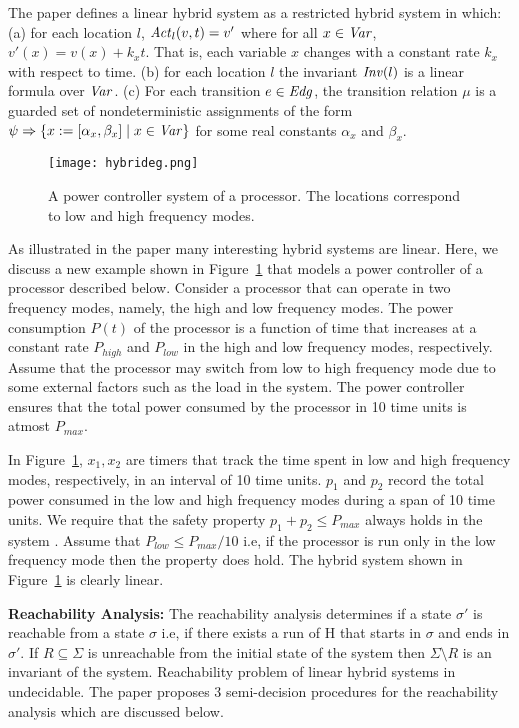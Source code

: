 The paper defines a linear hybrid system as a restricted hybrid system in which:
(a) for each location $l$, $\mathit{Act}_l(v,t) = v'$ where for all $x \in \mathit{Var}$, $v'(x) = v(x) + k_x t$. That is, each variable $x$ changes with a constant rate $k_x$ with respect to time.
(b) for each location $l$ the invariant $\mathit{Inv}(l)$ is a linear formula over $\mathit{Var}$.
(c) For each transition $e \in \mathit{Edg}$, the transition relation $\mu$ is a guarded set of nondeterministic assignments of the form $\psi \Rightarrow \{ x := [\alpha_x,\beta_x] \; | \; x \in \mathit{Var} \}$ for some real constants $\alpha_x$ and $\beta_x$.

\begin{figure}
\texttt{[image: hybrideg.png]} 
\caption{A power controller system of a processor.  
The locations correspond to low and high frequency modes.} \label{fig:hsys}
\end{figure}

As illustrated in the paper many interesting hybrid systems are linear.
Here, we discuss a new example shown in  Figure~\ref{fig:hsys} that models a power controller 
of a processor described below.
Consider a processor that can operate in two frequency modes, namely, the high and low frequency modes.
The power consumption $P(t)$ of the processor is a function of time that increases at a constant rate $P_{high}$ and
$P_{low}$ in the high and low frequency modes, respectively. 
Assume that the processor may switch from low to high frequency mode due to some external factors such as the load in the 
system. The power controller ensures that the total power consumed by the processor in 10 time units is atmost $P_{max}$. 

In Figure~\ref{fig:hsys}, $x_1, x_2$ are timers that track the time spent in low and high frequency modes, respectively, in an interval of 10 time units.
$p_1$ and $p_2$ record the total power consumed in the low and high frequency modes during a span of 10 time units.
We require that the safety property $p_1 + p_2 \le P_{max}$ always holds in the system .
Assume that $P_{low} \le P_{max}/10$ i.e, if the processor is run only in the low frequency mode then the property does hold.
The hybrid system shown in Figure~\ref{fig:hsys} is clearly linear.

\textbf{Reachability Analysis:}
The reachability analysis determines if a state $\sigma'$ is reachable from a state $\sigma$ i.e, if there exists
a run of H that starts in $\sigma$ and ends in $\sigma'$. If $R \subseteq \Sigma$ is unreachable from the initial state of the system then $\Sigma \setminus R$ is an invariant of the system.
Reachability problem of linear hybrid systems in undecidable. The paper proposes 3 semi-decision procedures for 
the reachability analysis which are discussed below.

